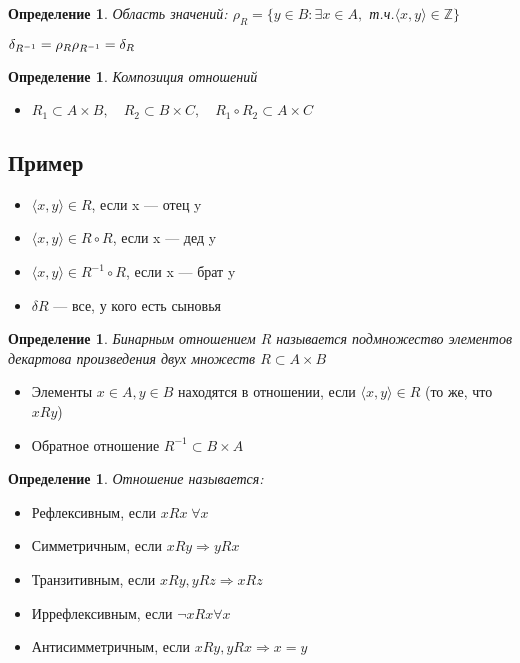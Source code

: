 \documentclass[12pt,letterpaper]{report}
\newtheorem{conj}[theorem]{Определение}
\begin{document}
\begin{conj} 
    Область значений: 
    $\rho_{R} = \{y \in B: \exists x \in A, $ т.ч.$ \langle x, y \rangle  \in \mathbb{Z} \} $ 
\end{conj}
$\delta_{R^{-1}} = \rho_{R} \\
\rho_{R^{-1}} = \delta_{R}$

\begin{conj} 
    Композиция отношений 
\end{conj}

\begin{itemize}
    \item[] $R_1 \subset A \times B, \quad R_2 \subset B \times C, \quad R_1 \circ R_2 \subset A \times C$
\end{itemize}
\subsection*{Пример}
\begin{itemize}
    \item $\langle x, y \rangle \in R$, если x — отец y
    \item $\langle x, y \rangle \in R \circ R$, если x — дед y
    \item $\langle x, y \rangle \in R^{-1} \circ R$, если x — брат y
    \item $\delta R$ — все, у кого есть сыновья
\end{itemize}
\begin{conj} 
    Бинарным отношением $R$ называется подмножество элементов декартова произведения двух
    множеств $R \subset A \times B$
\end{conj}

\begin{itemize}
    \item[] Элементы $x \in A, y \in B$ находятся в отношении, если $  \langle x, y \rangle \in R $ (то же, что $xRy$)
    \item[] Обратное отношение $R^{-1} \subset B \times A$ 
\end{itemize}

\begin{conj}
    Отношение называется:
\end{conj}
\begin{itemize}
    \item Рефлексивным, если $xRx \; \forall x$
    \item Симметричным, если $xRy \Longrightarrow yRx$
    \item Транзитивным, если $xRy, yRz \Longrightarrow xRz$
    \item Иррефлексивным, если $\neg xRx \forall x$
    \item Антисимметричным, если $xRy, yRx \Longrightarrow x = y$
\end{itemize}
\end{document}

